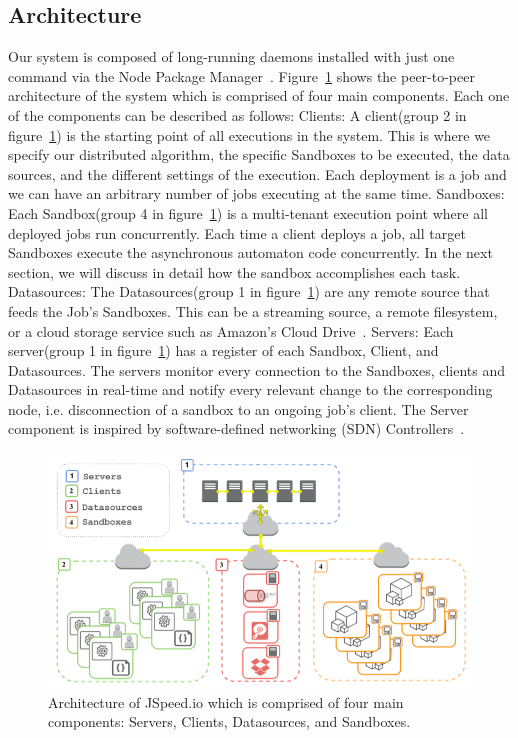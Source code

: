 \documentclass[10pt,reprint]{socc14}
\begin{document}
\subsection{Architecture}
Our system is composed of long-running daemons installed with just one command via the Node Package Manager~\cite{NPM}. Figure~\ref{fig:architectureDiagram} shows the peer-to-peer architecture of the system which is comprised of four main components. Each one of the components can be described as follows:
Clients: A client(group 2 in figure~\ref{fig:architectureDiagram})  is the starting point of all executions in the system. This is where we specify our distributed algorithm, the specific Sandboxes to be executed, the data sources, and the different settings of the execution. Each deployment is a job and we can have an arbitrary number of jobs executing at the same time.
Sandboxes: Each Sandbox(group 4 in figure~\ref{fig:architectureDiagram}) is a multi-tenant execution point where all deployed jobs run concurrently. Each time a client deploys a job, all target Sandboxes execute the asynchronous automaton code concurrently. In the next section, we will discuss in detail how the sandbox accomplishes each task.
Datasources: The Datasources(group 1 in figure~\ref{fig:architectureDiagram}) are any remote source that feeds the Job’s Sandboxes. This can be a streaming source, a remote filesystem, or a cloud storage service such as Amazon’s Cloud Drive~\cite{Amazon}.
Servers: Each server(group 1 in figure~\ref{fig:architectureDiagram})  has a register of each Sandbox, Client, and Datasources. The servers monitor every connection to the Sandboxes, clients and Datasources in real-time and notify every relevant change to the corresponding node, i.e. disconnection of a sandbox to an ongoing job’s client. The Server component is inspired by software-defined networking (SDN) Controllers~\cite{Mckeown2008}.


\begin{figure}
	\centering
	\includegraphics[scale=0.6]{architectureDiagram}
	\caption{Architecture of JSpeed.io which is comprised of four main components: Servers, Clients, Datasources, and Sandboxes.}
	\label{fig:architectureDiagram}
\end{figure}
\end{document}

